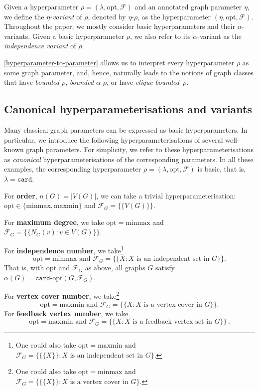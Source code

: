 \documentclass[11pt]{article}
\newcommand{\minmax}{\mathrm{minmax}}
\newcommand{\maxmin}{\mathrm{maxmin}}
\newcommand{\opt}{\mathrm{opt}}
\theoremstyle{plain}
\theoremstyle{definition}
\theoremstyle{remark}
\numberwithin{equation}{section}
\begin{document}
Given a hyperparameter $\rho = (\lambda,\opt, \mathcal{F})$ and an annotated graph parameter $\eta$, we define the \emph{$\eta$-variant} of $\rho$, denoted by $\eta\text{-}\rho$, as the hyperparameter $(\eta, \opt, \mathcal{F})$.
Throughout the paper, we mostly consider basic hyperparameters and their $\alpha$-variants.
Given a basic hyperparameter $\rho$, we also refer to its $\alpha$-variant as the \emph{independence variant} of $\rho$.

\medskip
\cref{hyperparameter-to-parameter} allows us to interpret every hyperparameter $\rho$ as some graph parameter, and, hence, naturally leads to the notions of graph classes that have \emph{bounded $\rho$}, \emph{bounded $\alpha\text{-}\rho$}, or have \emph{clique-bounded~$\rho$}.

\subsection{Canonical hyperparameterisations and variants}\label{sec:hyperparameterisations}

Many classical graph parameters can be expressed as basic hyperparameters.
In particular, we introduce the following hyperparameterisations of several well-known graph parameters.
For simplicity, we refer to these hyperparameterisations as \emph{canonical} hyperparameterisations of the corresponding parameters.
In all these examples, the corresponding hyperparameter $\rho = (\lambda, \opt, \mathcal{F})$ is basic, that is, $\lambda = \mathtt{card}$.

\medskip
\noindent For \textbf{order}, $n(G) = |V(G)|$, we can take a trivial hyperparameterisation: $\opt\in \{\minmax,\maxmin\}$ and $\mathcal{F}_G = \{\{V(G)\}\}$.

\medskip
\noindent For \textbf{maximum degree}, we take $\opt = \minmax$ and $\mathcal{F}_G = \big\{\{N_G(v) \colon v\in V(G)\}\big\}$.

\medskip
\noindent For \textbf{independence number}, we take\footnote{One could also take $\opt = \maxmin$ and $\mathcal{F}_G = \Big\{\big\{\{ X\}\big\} \colon X \text{ is an independent set in }G\Big\}$.}
    \[
    \opt = \minmax \text{ and } \mathcal{F}_G = \big\{\{X \colon X \text{ is an independent set in $G$}\}\big\}.
    \]
    That is, with $\opt$ and $\mathcal{F}_G$ as above, all graphs $G$ satisfy $\alpha(G) = \mathtt{card}\text{-}\opt(G,\mathcal{F}_G)$.
    
\medskip
\noindent For \textbf{vertex cover number}, we take\footnote{One could also take $\opt = \minmax$ and $\mathcal{F}_G = \Big\{\big\{\{ X\}\big\} \colon X \text{ is a vertex cover in }G\Big\}$.}
    \[
    \opt = \maxmin \text{ and } \mathcal{F}_G = \big\{\{X \colon X \text{ is a vertex cover in $G$}\}\big\}.
    \]
\medskip
\noindent For \textbf{feedback vertex number}, we take \[
    \opt = \maxmin \text{ and } \mathcal{F}_G = \big\{\{X \colon X \text{ is a feedback vertex set in $G$}\}\big\}\,.\]
\end{document}
